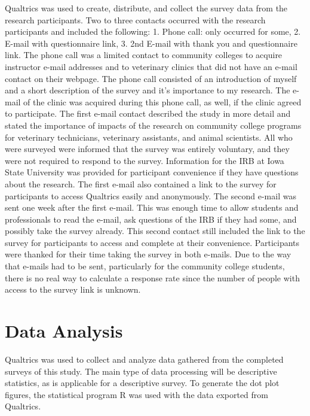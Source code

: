 Qualtrics\textsuperscript{\textregistered} was used to create, distribute, and collect the survey data from the research participants.  Two to three contacts occurred with the research participants and included the following: 1. Phone call: only occurred for some, 2. E-mail with questionnaire link, 3. 2nd E-mail with thank you and questionnaire link.  The phone call was a limited contact to community colleges to acquire instructor e-mail addresses and to veterinary clinics that did not have an e-mail contact on their webpage. The phone call consisted of an introduction of myself and a short description of the survey and it's importance to my research. The e-mail of the clinic was acquired during this phone call, as well, if the clinic agreed to participate. The first e-mail contact described the study in more detail and stated the importance of impacts of the research on community college programs for veterinary technicians, veterinary assistants, and animal scientists. All who were surveyed were informed that the survey was entirely voluntary, and they were not required to respond to the survey.  Information for the IRB at Iowa State University was provided for participant convenience if they have questions about the research. The first e-mail also contained a link to the survey for participants to access Qualtrics\textsuperscript{\textregistered} easily and anonymously. The second e-mail was sent one week after the first e-mail. This was enough time to allow students and professionals to read the e-mail, ask questions of the IRB if they had some, and possibly take the survey already. This second contact still included the link to the survey for participants to access and complete at their convenience. Participants were thanked for their time taking the survey in both e-mails. Due to the way that e-mails had to be sent, particularly for the community college students, there is no real way to calculate a response rate since the number of people with access to the survey link is unknown.

\section{Data Analysis}

Qualtrics\textsuperscript{\textregistered} was used to collect and analyze data gathered from the completed surveys of this study. The main type of data processing will be descriptive statistics, as is applicable for a descriptive survey. To generate the dot plot figures, the statistical program R was used with the data exported from Qualtrics\textsuperscript{\textregistered}\citep{R}.

